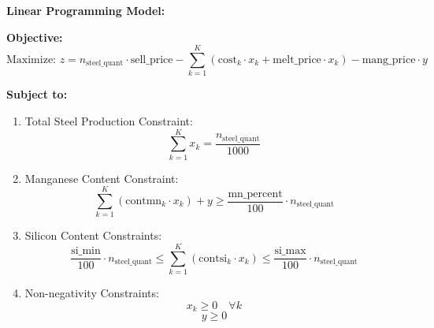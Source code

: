 \documentclass{article}
\begin{document}
\textbf{Linear Programming Model:}

\textbf{Objective:}
\[
\text{Maximize: } z = n_{\text{steel\_quant}} \cdot \text{sell\_price} - \sum_{k=1}^{K} \left( \text{cost}_{k} \cdot x_k + \text{melt\_price} \cdot x_k \right) - \text{mang\_price} \cdot y
\]

\textbf{Subject to:}

\begin{enumerate}
    \item Total Steel Production Constraint:
    \[
    \sum_{k=1}^{K} x_k = \frac{n_{\text{steel\_quant}}}{1000}
    \]

    \item Manganese Content Constraint:
    \[
    \sum_{k=1}^{K} \left(\text{contmn}_{k} \cdot x_k \right) + y \geq \frac{\text{mn\_percent}}{100} \cdot n_{\text{steel\_quant}}
    \]

    \item Silicon Content Constraints:
    \[
    \frac{\text{si\_min}}{100} \cdot n_{\text{steel\_quant}} \leq \sum_{k=1}^{K} \left( \text{contsi}_{k} \cdot x_k \right) \leq \frac{\text{si\_max}}{100} \cdot n_{\text{steel\_quant}}
    \]

    \item Non-negativity Constraints:
    \[
    x_k \geq 0 \quad \forall k
    \]
    \[
    y \geq 0
    \]
\end{enumerate}
\end{document}
